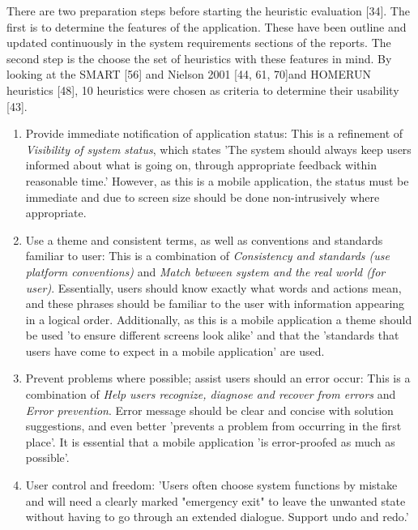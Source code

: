 \documentclass[a4 paper, 12pt]{article}
\begin{document}
    There are two preparation steps before starting the heuristic evaluation [34]. The first is to determine the features of the application. These have been outline and updated continuously in the system requirements sections of the reports. The second step is the choose the set of heuristics with these features in mind. By looking at the \textcolor{mygreen}{SMART} [56] and \textcolor{myblue}{Nielson 2001} [44, 61, 70]and \textcolor{myorange}{HOMERUN} heuristics [48], 10 heuristics were chosen as criteria to determine their usability [43].
        \begin{enumerate}
            \item \textcolor{mygreen}{Provide immediate notification of application status}: 
            This is a refinement of \textit{\textcolor{myblue}{Visibility of system status}}, which states 'The system should always keep users informed about what is going on, through appropriate feedback within reasonable time.' However, as this is a mobile application, the status must be immediate and due to screen size should be done non-intrusively where appropriate.
            \item \textcolor{mygreen}{Use a theme and consistent terms, as well as conventions and standards familiar to user}: This is a combination of \textit{\textcolor{myblue}{Consistency and standards (use platform conventions)}} and \textit{\textcolor{myblue}{Match between system and the real world (for user)}}. Essentially, users should know exactly what words and actions mean, and these phrases should be familiar to the user with information appearing in a logical order. Additionally, as this is a mobile application a theme should be used 'to ensure different screens look alike' and that the 'standards that users have come to expect in a mobile application' are used.         
            \item \textcolor{mygreen}{Prevent problems where possible; assist users should an error occur}: This is a combination of \textit{\textcolor{myblue}{Help users recognize, diagnose and recover from errors}} and \textit{\textcolor{myblue}{Error prevention}}. Error message should be clear and concise with solution suggestions, and even better 'prevents a problem from occurring in the first place'. It is essential that a mobile application 'is error-proofed as much as possible'.        
            \item \textcolor{myblue}{User control and freedom:} 'Users often choose system functions by mistake and will need a clearly marked "emergency exit" to leave the unwanted state without having to go through an extended dialogue. Support undo and redo.'        

\end{enumerate}
\end{document}
